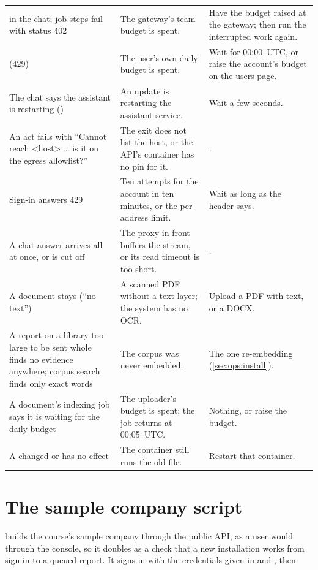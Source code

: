 \begin{xltabular}{\textwidth}{@{}L{43mm}YL{42mm}@{}}
 in the chat; job steps fail with status 402 & The gateway's team budget is spent. & Have the budget raised at the gateway; then run the interrupted work again. \\
 (429) & The user's own daily budget is spent. & Wait for 00:00~UTC, or raise the account's budget on the users page. \\
The chat says the assistant is restarting () & An update is restarting the assistant service. & Wait a few seconds. \\
An act fails with \enquote{Cannot reach <host> … is it on the egress allowlist?} & The exit does not list the host, or the API's container has no pin for it. & . \\
Sign-in answers 429  & Ten attempts for the account in ten minutes, or the per-address limit. & Wait as long as the  header says. \\
A chat answer arrives all at once, or is cut off & The proxy in front buffers the stream, or its read timeout is too short. & . \\
A document stays  (\enquote{no text}) & A scanned PDF without a text layer; the system has no OCR. & Upload a PDF with text, or a DOCX. \\
A report on a library too large to be sent whole finds no evidence anywhere; corpus search finds only exact words & The corpus was never embedded. & The one re-embedding (\cref{sec:ops:install}). \\
A document's indexing job says it is waiting for the daily budget & The uploader's budget is spent; the job returns at 00:05~UTC. & Nothing, or raise the budget. \\
A changed  or  has no effect & The container still runs the old file. & Restart that container. \\
\end{xltabular}


\section{The sample company script}\label{sec:ops:demo}

 builds the course's sample company through the public API, as a
user would through the console, so it doubles as a check that a new installation works from
sign-in to a queued report. It signs in with the credentials given in  and
, then:

